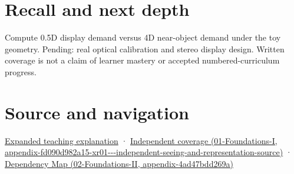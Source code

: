 \section{Recall and next depth}\label{appendix-f90cee1be7a4-recall-and-next-depth}

Compute 0.5D display demand versus 4D near-object demand under the toy geometry. Pending: real optical calibration and stereo display design. Written coverage is not a claim of learner mastery or accepted numbered-curriculum progress.

\section{Source and navigation}\label{appendix-f90cee1be7a4-source-and-navigation}

\href{Continuous\%20Notes/University\%20-\%20Worlds,\%20Images\%20and\%20Inference\%20-\%20Graphics,\%20Vision\%20and\%20Photography\#Focus\%20and\%20stereo\%20can\%20disagree\%20even\%20when\%20the\%20images\%20are\%20sharp}{Expanded teaching explanation} · \href{../01-Foundations-I/main.pdf\#nameddest=appendix-fd090d982a15-xr01---independent-seeing-and-representation-source}{Independent coverage (01-Foundations-I, appendix-fd090d982a15-xr01-\/-\/-independent-seeing-and-representation-source)} · \href{../02-Foundations-II/main.pdf\#nameddest=appendix-4ad47bdd269a}{Dependency Map (02-Foundations-II, appendix-4ad47bdd269a)}
